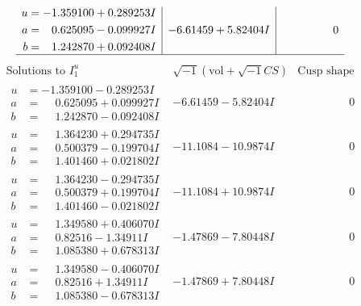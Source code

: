 \documentclass[1p]{elsarticle_modified}
\theoremstyle{definition}
\newcommand{\I}{\sqrt{-1}}
\begin{document}
$$\begin{array}{c|c|c}
\begin{aligned}
u &= -1.359100 + 0.289253 I \\
a &= \phantom{-}0.625095 - 0.099927 I \\
b &= \phantom{-}1.242870 + 0.092408 I\end{aligned}
 & -6.61459 + 5.82404 I & \phantom{-0.000000 } 0\\
 \hline 
 \end{array}$$\newpage$$\begin{array}{c|c|c}  
\text{Solutions to }I^u_{1}& \I (\text{vol} + \sqrt{-1}CS) & \text{Cusp shape}\\
 \hline 
\begin{aligned}
u &= -1.359100 - 0.289253 I \\
a &= \phantom{-}0.625095 + 0.099927 I \\
b &= \phantom{-}1.242870 - 0.092408 I\end{aligned}
 & -6.61459 - 5.82404 I & \phantom{-0.000000 } 0 \\ \hline\begin{aligned}
u &= \phantom{-}1.364230 + 0.294735 I \\
a &= \phantom{-}0.500379 - 0.199704 I \\
b &= \phantom{-}1.401460 + 0.021802 I\end{aligned}
 & -11.1084 - 10.9874 I & \phantom{-0.000000 } 0 \\ \hline\begin{aligned}
u &= \phantom{-}1.364230 - 0.294735 I \\
a &= \phantom{-}0.500379 + 0.199704 I \\
b &= \phantom{-}1.401460 - 0.021802 I\end{aligned}
 & -11.1084 + 10.9874 I & \phantom{-0.000000 } 0 \\ \hline\begin{aligned}
u &= \phantom{-}1.349580 + 0.406070 I \\
a &= \phantom{-}0.82516 - 1.34911 I \\
b &= \phantom{-}1.085380 + 0.678313 I\end{aligned}
 & -1.47869 - 7.80448 I & \phantom{-0.000000 } 0 \\ \hline\begin{aligned}
u &= \phantom{-}1.349580 - 0.406070 I \\
a &= \phantom{-}0.82516 + 1.34911 I \\
b &= \phantom{-}1.085380 - 0.678313 I\end{aligned}
 & -1.47869 + 7.80448 I & \phantom{-0.000000 } 0 \\ \hline\begin{aligned}

\end{aligned}
\end{array}$$
\end{document}
